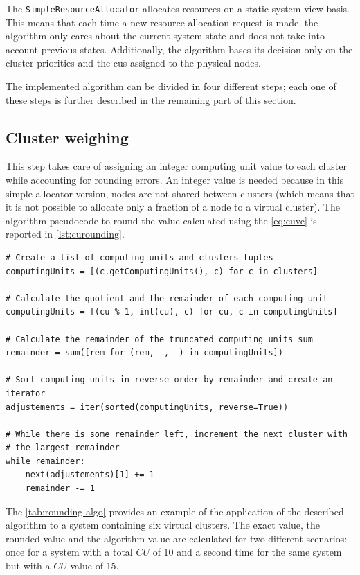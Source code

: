 The \texttt{SimpleResourceAllocator} allocates resources on a static system view basis. This means that each time a new resource allocation request is made, the algorithm only cares about the current system state and does not take into account previous states. Additionally, the algorithm bases its decision only on the cluster priorities and the \glspl{cu} assigned to the physical nodes.

The implemented algorithm can be divided in four different steps; each one of these steps is further described in the remaining part of this section.

\subsection{Cluster weighing}
\label{sec:cluster-weighing}

This step takes care of assigning an integer computing unit value to each cluster while accounting for rounding errors. An integer value is needed because in this simple allocator version, nodes are not shared between clusters (which means that it is not possible to allocate only a fraction of a node to a virtual cluster). The algorithm pseudocode to round the value calculated using the \autoref{eq:cuvc} is reported in \autoref{lst:curounding}.
	
\lstset{language=python,caption=CU rounding algorithm,label=lst:curounding}
\begin{lstlisting}
# Create a list of computing units and clusters tuples
computingUnits = [(c.getComputingUnits(), c) for c in clusters]

# Calculate the quotient and the remainder of each computing unit
computingUnits = [(cu % 1, int(cu), c) for cu, c in computingUnits]

# Calculate the remainder of the truncated computing units sum
remainder = sum([rem for (rem, _, _) in computingUnits])

# Sort computing units in reverse order by remainder and create an iterator
adjustements = iter(sorted(computingUnits, reverse=True))

# While there is some remainder left, increment the next cluster with
# the largest remainder
while remainder:
	next(adjustements)[1] += 1
	remainder -= 1
\end{lstlisting}

The \autoref{tab:rounding-algo} provides an example of the application of the described algorithm to a system containing six virtual clusters. The exact value, the rounded value and the algorithm value are calculated for two different scenarios: once for a system with a total $CU$ of 10 and a second time for the same system but with a $CU$ value of 15.

